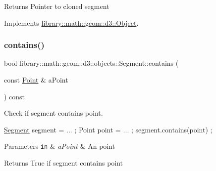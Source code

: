 \begin{DoxyReturn}{Returns}
Pointer to cloned segment 
\end{DoxyReturn}


Implements \hyperlink{classlibrary_1_1math_1_1geom_1_1d3_1_1_object_a1a784c6b359e0eb97cd34fabc42f2f3f}{library\+::math\+::geom\+::d3\+::\+Object}.

\mbox{\label{classlibrary_1_1math_1_1geom_1_1d3_1_1objects_1_1_segment_aabdbcd6bbfbe9350fe53f1b3563b5652}} 
\subsubsection{\texorpdfstring{contains()}{contains()}}
{\footnotesize\ttfamily bool library\+::math\+::geom\+::d3\+::objects\+::\+Segment\+::contains (\begin{DoxyParamCaption}\item[{const \hyperlink{classlibrary_1_1math_1_1geom_1_1d3_1_1objects_1_1_point}{Point} \&}]{a\+Point }\end{DoxyParamCaption}) const}



Check if segment contains point. 


\begin{DoxyCode}
\hyperlink{classlibrary_1_1math_1_1geom_1_1d3_1_1objects_1_1_segment_a5562342d1edf2f52e37ce1bc138ee7d7}{Segment} segment = ... ;
Point point = ... ;
segment.contains(point) ;
\end{DoxyCode}



\begin{DoxyParams}[1]{Parameters}
\mbox{\tt in}  & {\em a\+Point} & An point \\
\hline
\end{DoxyParams}
\begin{DoxyReturn}{Returns}
True if segment contains point 
\end{DoxyReturn}
\mbox{\label{classlibrary_1_1math_1_1geom_1_1d3_1_1objects_1_1_segment_a6788da2dd6ee48ded2da197c01ea7f3d}} 
